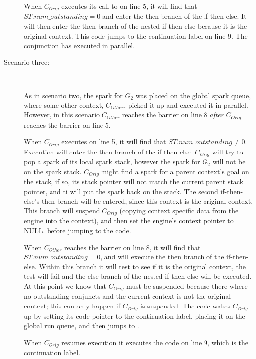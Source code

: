 \begin{description}
    When $C_{Orig}$ executes its call to \joinandcontinue on line 5,
    it will find that $ST.num\_outstanding = 0$ and enter the then
    branch of the if-then-else.
    It will then enter the then branch of the nested if-then-else
    because it is the original context.
    This code jumps to the continuation label on line 9.
    The conjunction has executed in parallel.

    \item[Scenario three:]~

    As in scenario two,
    the spark for $G_2$ was placed on the global spark queue,
    where some other context, $C_{Other}$, picked it up and executed it
    in parallel.
    However,
    in this scenario
    $C_{Other}$ reaches the barrier on line 8 \emph{after}
    $C_{Orig}$ reaches the barrier on line 5.

    When $C_{Orig}$ executes \joinandcontinue on line 5,
    it will find that $ST.num\_outstanding \neq 0$.
    Execution will enter the then branch of the if-then-else.
    $C_{Orig}$ will try to pop a spark of its local spark stack,
    however the spark for $G_2$ will not be on the spark stack.
    $C_{Orig}$ might find a spark for a parent context's goal on the
    stack,
    if so, its stack pointer will not match the current parent stack
    pointer, and ti will put the spark back on the stack.
    The second if-then-else's then branch will be entered, since this
    context is the original context.
    This branch will suspend $C_{Orig}$
    (copying context specific data from the engine into the context),
    and then set the engine's context pointer to NULL.
    before jumping to the \getglobalwork code.

    When $C_{Other}$ reaches the barrier on line 8,
    it will find that $ST.num\_outstanding = 0$,
    and will execute the then branch of the if-then-else.
    Within this branch it will test to see if it is the original
    context,
    the test will fail and the else branch of the nested if-then-else
    will be executed.
    At this point we know that $C_{Orig}$ must be suspended because
    there where no outstanding conjuncts and the current context is not
    the original context;
    this can only happen if $C_{Orig}$ is suspended.
    The code wakes $C_{Orig}$ up by
    setting its code pointer to the continuation label,
    placing it on the global run queue,
    and then jumps to \getglobalwork.

    When $C_{Orig}$ resumes execution it executes the code on line 9,
    which is the continuation label.

\end{description}

